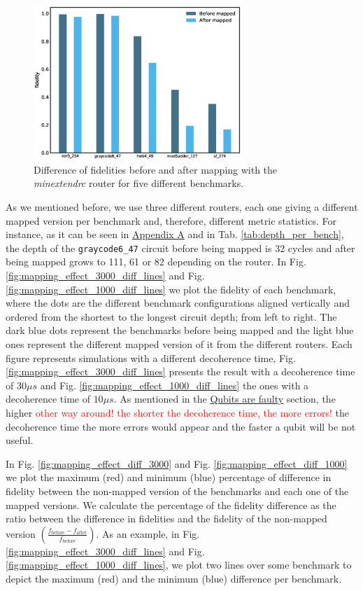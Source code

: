 \begin{figure}[htbp]
\centering
\includegraphics[width=0.7\textwidth]{figures/f_diff_bar_plot.eps}
\caption{\label{fig:f_diff_bar_plot}
Difference of fidelities before and after mapping with the \emph{minextendrc} router for five different benchmarks.}
\end{figure}
As we mentioned before, we use three different routers, each one giving a different mapped version per benchmark and, therefore, different metric statistics.
For instance, as it can be seen in \href{appendix-1.org}{Appendix A} and in Tab. \ref{tab:depth_per_bench}, the depth of the \texttt{graycode6\_47} circuit before being mapped is 32 cycles and after being mapped grows to 111, 61 or 82 depending on the router.
In Fig. \ref{fig:mapping_effect_3000_diff_lines} and Fig. \ref{fig:mapping_effect_1000_diff_lines} we plot the fidelity of each benchmark, where the dots are the different benchmark configurations aligned vertically and ordered from the shortest to the longest circuit depth; from left to right.
The dark blue dots represent the benchmarks before being mapped and the light blue ones represent the different mapped version of it from the different routers.
Each figure represents simulations with a different decoherence time, Fig. \ref{fig:mapping_effect_3000_diff_lines} presents the result with a decoherence time of \(30 \mu s\) and Fig. \ref{fig:mapping_effect_1000_diff_lines} the ones with a decoherence time of \(10 \mu s\).
As mentioned in the \href{quantum_computing.org}{Qubits are faulty} section, the higher \textcolor{red}{other way around! the shorter the decoherence time, the more errors!} the decoherence time the more errors would appear and the faster a qubit will be not useful.

In Fig. \ref{fig:mapping_effect_diff_3000} and Fig. \ref{fig:mapping_effect_diff_1000} we plot the maximum (red) and minimum (blue) percentage of difference in fidelity between the non-mapped version of the benchmarks and each one of the mapped versions.
We calculate the percentage of the fidelity difference as the ratio between the difference in fidelities and the fidelity of the non-mapped version \(\left(\frac{f_{\text{before}} - f_{\text{after}}}{f_{\text{before}}}\right)\).
As an example, in Fig. \ref{fig:mapping_effect_3000_diff_lines} and Fig. \ref{fig:mapping_effect_1000_diff_lines}, we plot two lines over some benchmark to depict the maximum (red) and the minimum (blue) difference per benchmark.

